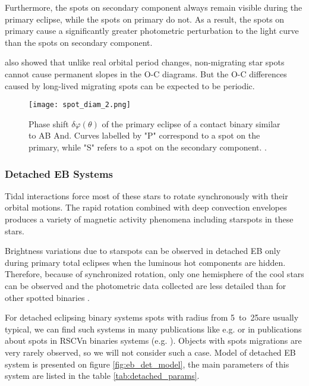Furthermore, the spots on secondary component always remain visible during the primary eclipse,
while the spots on primary do not. As a result, the spots on primary cause a
significantly greater photometric perturbation to the light curve than the spots on secondary component.

\citeauthor{Kalimeris2002} also showed that unlike real orbital period changes, non-migrating star spots cannot
cause permanent slopes in the O-C diagrams. 
But the O-C differences caused by long-lived migrating spots can be expected to be periodic.

\begin{figure}[!h]
\vspace{0cm}
\centerline{\texttt{[image: spot\_diam\_2.png]}}
\caption{Phase shift $\delta\varphi(\theta)$ of the primary eclipse of a contact
binary similar to AB And. Curves labelled by "P" correspond
to a spot on the primary, while "S" refers to a spot on the
secondary component. \citep{Kalimeris2002}.}
\label{fig:spot_diam}
\end{figure}   
 

\subsubsection{Detached EB Systems}

Tidal interactions force most of these stars to rotate synchronously with their orbital motions.
The rapid rotation combined with deep convection envelopes produces a variety of magnetic activity phenomena including starspots in these stars.

Brightness variations due to starspots can be observed in detached EB only during primary total eclipses when the luminous hot components are hidden. Therefore, because of synchronized rotation, only one hemisphere of the cool stars can be observed and the photometric data collected are less detailed than for other spotted binaries \citep{Berdyugina2005}.
 
For detached eclipsing binary systems spots with radius from 5\degree~to~25\degree are usually typical, we can find such systems in many publications like e.g. \cite{Liakos2011} or in publications about spots in RSCVn binaries systems (e.g. \cite{Roettenbacher2011, Kovari2012, Kozhevnikova2015}). Objects with spots migrations are very rarely observed, so we will not consider such a case.
Model of detached EB system is presented on figure \ref{fig:eb_det_model}, the main parameters of this system are listed in the table \ref{tab:detached_params}.

